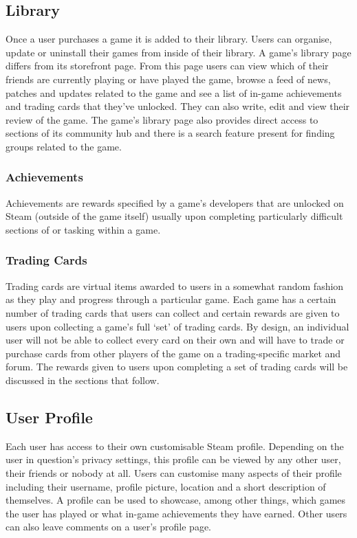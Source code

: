 \subsection{Library}

Once a user purchases a game it is added to their library. Users can organise, update or uninstall their games from inside of their library. A game's library page differs from its storefront page. From this page users can view which of their friends are currently playing or have played the game, browse a feed of news, patches and updates related to the game and see a list of in-game achievements and trading cards that they've unlocked. They can also write, edit and view their review of the game. The game's library page also provides direct access to sections of its community hub and there is a search feature present for finding groups related to the game.

\subsubsection{Achievements}

Achievements are rewards specified by a game's developers that are unlocked on Steam (outside of the game itself) usually upon completing particularly difficult sections of or tasking within a game.

\subsubsection{Trading Cards}

Trading cards are virtual items awarded to users in a somewhat random fashion as they play and progress through a particular game. Each game has a certain number of trading cards that users can collect and certain rewards are given to users upon collecting a game's full `set' of trading cards. By design, an individual user will not be able to collect every card on their own and will have to trade or purchase cards from other players of the game on a trading-specific market and forum. The rewards given to users upon completing a set of trading cards will be discussed in the sections that follow.

\subsection{User Profile}

Each user has access to their own customisable Steam profile. Depending on the user in question's privacy settings, this profile can be viewed by any other user, their friends or nobody at all. Users can customise many aspects of their profile including their username, profile picture, location and a short description of themselves. A profile can be used to showcase, among other things, which games the user has played or what in-game achievements they have earned. Other users can also leave comments on a user's profile page.

